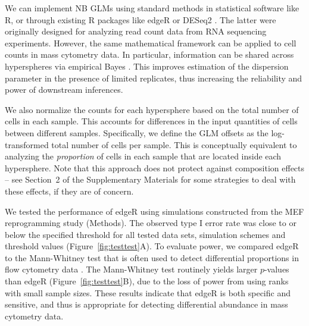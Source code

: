 \documentclass{article}
\newcommand{\suppcomponorm}{2}
\begin{document}
We can implement NB GLMs using standard methods in statistical software like R, or through existing R packages like edgeR \cite{robinson2010edgeR} or DESeq2 \cite{love2014moderated}.
The latter were originally designed for analyzing read count data from RNA sequencing experiments.
However, the same mathematical framework can be applied to cell counts in mass cytometry data.
In particular, information can be shared across hyperspheres via empirical Bayes \cite{mccarthy2012differential, lund2012detecting}.
This improves estimation of the dispersion parameter in the presence of limited replicates, thus increasing the reliability and power of downstream inferences.

We also normalize the counts for each hypersphere based on the total number of cells in each sample.
This accounts for differences in the input quantities of cells between different samples.
Specifically, we define the GLM offsets as the log-transformed total number of cells per sample.
This is conceptually equivalent to analyzing the \textit{proportion} of cells in each sample that are located inside each hypersphere.
Note that this approach does not protect against composition effects -- see Section~\suppcomponorm{} of the Supplementary Materials for some strategies to deal with these effects, if they are of concern.

We tested the performance of edgeR using simulations constructed from the MEF reprogramming study (Methods).
The observed type I error rate was close to or below the specified threshold for all tested data sets, simulation schemes and threshold values (Figure~\ref{fig:testtest}A).
To evaluate power, we compared edgeR to the Mann-Whitney test that is often used to detect differential proportions in flow cytometry data \cite{watson1992significance}.
The Mann-Whitney test routinely yields larger $p$-values than edgeR (Figure~\ref{fig:testtest}B), due to the loss of power from using ranks with small sample sizes.
These results indicate that edgeR is both specific and sensitive, and thus is appropriate for detecting differential abundance in mass cytometry data.
\end{document}
